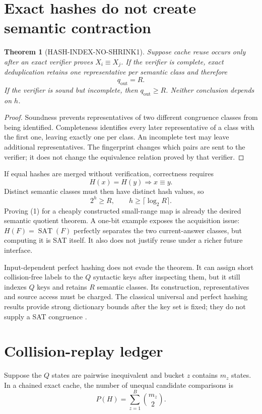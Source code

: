 \documentclass[11pt]{article}
\newtheorem{theorem}{Theorem}
\newcommand{\SAT}{\operatorname{SAT}}
\begin{document}
\section{Exact hashes do not create semantic contraction}
\begin{theorem}[HASH-INDEX-NO-SHRINK1]
Suppose cache reuse occurs only after an exact verifier proves
$X_i\equiv X_j$.  If the verifier is complete, exact deduplication retains
one representative per semantic class and therefore
\[
 q_{\mathrm{out}}=R.
\]
If the verifier is sound but incomplete, then $q_{\mathrm{out}}\ge R$.
Neither conclusion depends on $h$.
\end{theorem}
\begin{proof}
Soundness prevents representatives of two different congruence classes from
being identified.  Completeness identifies every later representative of a
class with the first one, leaving exactly one per class.  An incomplete test
may leave additional representatives.  The fingerprint changes which pairs
are sent to the verifier; it does not change the equivalence relation proved
by that verifier.
\end{proof}

If equal hashes are merged without verification, correctness requires
\[
 H(x)=H(y)\Longrightarrow x\equiv y.
\tag{1}
\]
Distinct semantic classes must then have distinct hash values, so
\[
 2^h\ge R,\qquad h\ge\lceil\log_2R\rceil.
\tag{2}
\]
Proving (1) for a cheaply constructed small-range map is already the desired
semantic quotient theorem.  A one-bit example exposes the acquisition issue:
$H(F)=\SAT(F)$ perfectly separates the two current-answer classes, but
computing it is SAT itself.  It also does not justify reuse under a richer
future interface.

Input-dependent perfect hashing does not evade the theorem.  It can assign
short collision-free labels to the $Q$ syntactic keys after inspecting them,
but it still indexes $Q$ keys and retains $R$ semantic classes.  Its
construction, representatives and source access must be charged.  The
classical universal and perfect hashing results provide strong dictionary
bounds after the key set is fixed; they do not supply a SAT congruence
\cite{carterwegman1979,fks1984}.

\section{Collision-replay ledger}
Suppose the $Q$ states are pairwise inequivalent and bucket $z$ contains
$m_z$ states.  In a chained exact cache, the number of unequal candidate
comparisons is
\[
 P(H)=\sum_{z=1}^{B}\binom{m_z}{2}.
\tag{3}
\]
\end{document}
